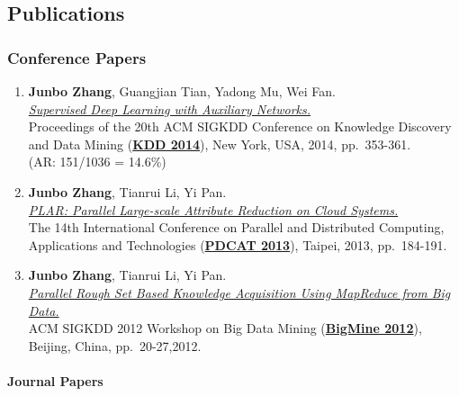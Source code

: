 \documentclass[]{article}
\begin{document}
\subsection{Publications}\label{publications}

\small

\subsubsection{Conference Papers}\label{conference-papers}

\begin{enumerate}
\def\labelenumi{\arabic{enumi}.}
\item
  \textbf{Junbo Zhang}, Guangjian Tian, Yadong Mu, Wei Fan.\\
  \href{http://dx.doi.org/10.1145/2623330.2623618}{\emph{Supervised Deep
  Learning with Auxiliary Networks.}}\\ Proceedings of the 20th ACM
  SIGKDD Conference on Knowledge Discovery and Data Mining
  (\href{http://www.kdd.org/kdd2014/}{\textbf{KDD 2014}}), New York,
  USA, 2014, pp.~353-361.\\ (AR: 151/1036 = 14.6\%)
\item
  \textbf{Junbo Zhang}, Tianrui Li, Yi Pan.\\
  \href{http://dx.doi.org/10.1109/PDCAT.2013.36}{\emph{PLAR: Parallel
  Large-scale Attribute Reduction on Cloud Systems.}}\\ The 14th
  International Conference on Parallel and Distributed Computing,
  Applications and Technologies
  (\href{http://pdcat13.csie.ntust.edu.tw/}{\textbf{PDCAT 2013}}),
  Taipei, 2013, pp.~184-191.
\item
  \textbf{Junbo Zhang}, Tianrui Li, Yi Pan.\\
  \href{http://doi.acm.org/10.1145/2351316.2351320}{\emph{Parallel Rough
  Set Based Knowledge Acquisition Using MapReduce from Big Data.}}\\ ACM
  SIGKDD 2012 Workshop on Big Data Mining
  (\href{http://kdd2012.sigkdd.org/workshops.shtml}{\textbf{BigMine
  2012}}), Beijing, China, pp.~20-27,2012.
\end{enumerate}

\paragraph{Journal Papers}\label{journal-papers}
\end{document}
